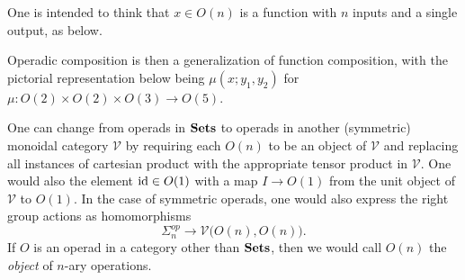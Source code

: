 \begin{rem}\label{rem:op-def}
One is intended to think that $x \in O(n)$ is a function with $n$ inputs and a single output, as below.
  \begin{center}
  \end{center}
Operadic composition is then a generalization of function composition, with the pictorial representation below being $\mu(x; y_{1}, y_{2})$ for $\mu \colon O(2) \times O(2) \times O(3) \rightarrow O(5)$.
  \begin{center}
  \end{center}
  \end{rem}


\begin{rem}\label{rem:nary-ops-V}
One can change from operads in $\mathbf{Sets}$ to operads in another (symmetric) monoidal category $\mathcal{V}$ by requiring each $O(n)$ to be an object of $\mathcal{V}$ and replacing all instances of cartesian product with the appropriate tensor product in $\mathcal{V}$. One would also the element $\textrm{id} \in O(1)$ with a map $I \rightarrow O(1)$ from the unit object of $\mathcal{V}$ to $O(1)$. In the case of symmetric operads, one would also express the right group actions as homomorphisms
\[
\Sigma_n^{op} \to \mathcal{V}\big( O(n), O(n) \big).
\]
If $O$ is an operad in a category other than $\mathbf{Sets}$, then we would call $O(n)$ the \emph{object} of $n$-ary operations.
\end{rem}

